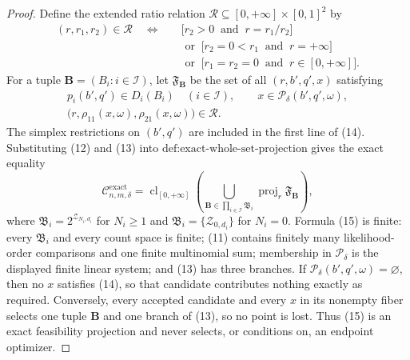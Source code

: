 \documentclass{article}
\begin{document}
\begin{proof}
Define the extended ratio relation \(\mathscr R\subseteq[0,+\infty]\times[0,1]^2\) by
\[
 \begin{aligned}
 (r,r_1,r_2)\in\mathscr R\quad\Longleftrightarrow\quad
 &\bigl[r_2>0\ \text{ and }\ r=r_1/r_2\bigr]\\
 &{}\text{ or }\ \bigl[r_2=0<r_1\ \text{ and }\ r=+\infty\bigr]\\
 &{}\text{ or }\ \bigl[r_1=r_2=0\ \text{ and }\ r\in[0,+\infty]\bigr]. \tag{13}
 \end{aligned}
\]
For a tuple \(\mathbf B=(B_i:i\in\mathcal I)\), let \(\mathfrak F_{\mathbf B}\) be the set of all \((r,b',q',x)\) satisfying
\[
 \begin{gathered}
 p_i(b',q')\in D_i(B_i)\quad(i\in\mathcal I),
 \qquad x\in\mathcal P_\delta(b',q',\omega),\\
 \bigl(r,\rho_{11}(x,\omega),\rho_{21}(x,\omega)\bigr)\in\mathscr R. \tag{14}
 \end{gathered}
\]
The simplex restrictions on \((b',q')\) are included in the first line of (14). Substituting (12) and (13) into \(\text{def:exact-whole-set-projection}\) gives the exact equality
\[
 \mathcal C_{n,m,\delta}^{\mathrm{exact}}
 =\operatorname{cl}_{[0,+\infty]}
   \left(
     \bigcup_{\mathbf B\in\prod_{i\in\mathcal I}\mathfrak B_i}
     \operatorname{proj}_r\mathfrak F_{\mathbf B}
   \right), \tag{15}
\]
where \(\mathfrak B_i=2^{\mathcal Z_{N_i,d_i}}\) for \(N_i\geq1\) and \(\mathfrak B_i=\{\mathcal Z_{0,d_i}\}\) for \(N_i=0\). Formula (15) is finite: every \(\mathfrak B_i\) and every count space is finite; (11) contains finitely many likelihood-order comparisons and one finite multinomial sum; membership in \(\mathcal P_\delta\) is the displayed finite linear system; and (13) has three branches. If \(\mathcal P_\delta(b',q',\omega)=\varnothing\), then no \(x\) satisfies (14), so that candidate contributes nothing exactly as required. Conversely, every accepted candidate and every \(x\) in its nonempty fiber selects one tuple \(\mathbf B\) and one branch of (13), so no point is lost. Thus (15) is an exact feasibility projection and never selects, or conditions on, an endpoint optimizer.
\end{proof}
\end{document}
